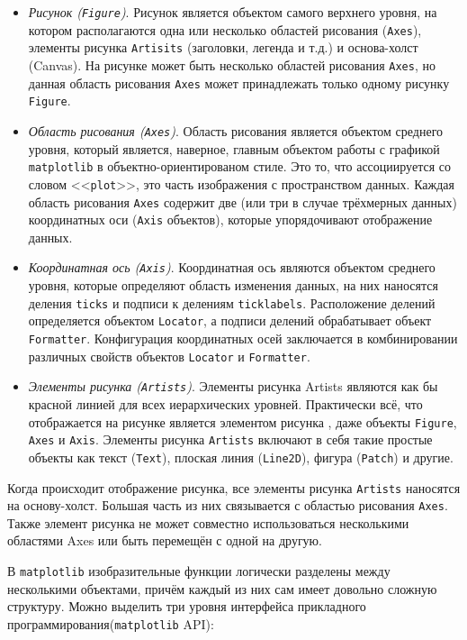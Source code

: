 \begin{itemize}
	\item  \textit{Рисунок (\lstinline!Figure!)}. Рисунок является объектом самого верхнего уровня, на котором располагаются одна или несколько областей рисования (\lstinline!Axes!), элементы рисунка \lstinline!Artisits! (заголовки, легенда и т.д.) и основа-холст (Canvas). На рисунке может быть несколько областей рисования \lstinline!Axes!, но данная область рисования \lstinline!Axes! может принадлежать только одному рисунку \lstinline!Figure!.
	\item  \textit{Область рисования (\lstinline!Axes!)}. Область рисования является объектом среднего уровня, который является, наверное, главным объектом работы с графикой \lstinline!matplotlib! в объектно-ориентированом стиле. Это то, что ассоциируется со словом <<\lstinline!plot!>>, это часть изображения с пространством данных. Каждая область рисования \lstinline!Axes! содержит две (или три в случае трёхмерных данных) координатных оси (\lstinline!Axis! объектов), которые упорядочивают отображение данных.
	\item  \textit{Координатная ось (\lstinline!Axis!)}. Координатная ось являются объектом среднего уровня, которые определяют область изменения данных, на них наносятся деления \lstinline!ticks! и подписи к делениям \lstinline!ticklabels!. Расположение делений определяется объектом \lstinline!Locator!, а подписи делений обрабатывает объект \lstinline!Formatter!. Конфигурация координатных осей заключается в комбинировании различных свойств объектов \lstinline!Locator! и \lstinline!Formatter!.
	\item  \textit{Элементы рисунка (\lstinline!Artists!)}. Элементы рисунка Artists являются как бы красной линией для всех иерархических уровней. Практически всё, что отображается на рисунке является элементом рисунка , даже объекты \lstinline!Figure!, \lstinline!Axes! и \lstinline!Axis!. Элементы рисунка \lstinline!Artists! включают в себя такие простые объекты как текст (\lstinline!Text!), плоская линия (\lstinline!Line2D!), фигура (\lstinline!Patch!) и другие.
\end{itemize}

Когда происходит отображение рисунка, все элементы рисунка \lstinline!Artists! наносятся на основу-холст. Большая часть из них связывается с областью рисования \lstinline!Axes!. Также элемент рисунка не может совместно использоваться несколькими областями Axes или быть перемещён с одной на другую.

В \lstinline!matplotlib! изобразительные функции логически разделены между несколькими объектами, причём каждый из них сам имеет довольно сложную структуру. Можно выделить три уровня интерфейса прикладного программирования(\lstinline!matplotlib! API):

